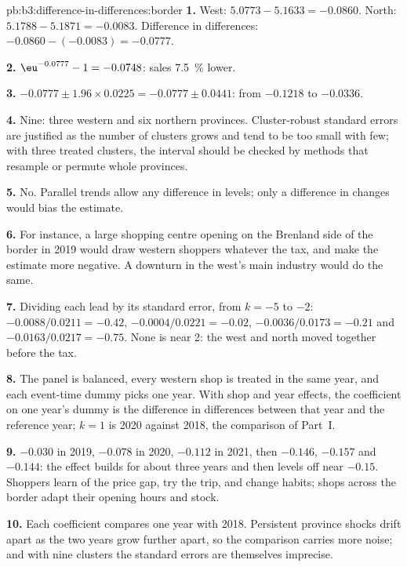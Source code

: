 \begin{solution}{pb:b3:difference-in-differences:border}
\textbf{1.} West: $5.0773 - 5.1633 = -0.0860$. North: $5.1788 - 5.1871 =
-0.0083$. Difference in differences: $-0.0860 - (-0.0083) = -0.0777$.

\textbf{2.} $\eu^{-0.0777} - 1 = -0.0748$: sales 7.5~\% lower.

\textbf{3.} $-0.0777 \pm 1.96 \times 0.0225 = -0.0777 \pm 0.0441$: from $-0.1218$
to $-0.0336$.

\textbf{4.} Nine: three western and six northern provinces. Cluster-robust
standard errors are justified as the number of clusters grows and tend to be too
small with few; with three treated clusters, the interval should be checked by
methods that resample or permute whole provinces.

\textbf{5.} No. Parallel trends allow any difference in levels; only a
difference in changes would bias the estimate.

\textbf{6.} For instance, a large shopping centre opening on the Brenland side
of the border in 2019 would draw western shoppers whatever the tax, and make
the estimate more negative. A downturn in the west's main industry would do the
same.

\textbf{7.} Dividing each lead by its standard error, from $k = -5$ to $-2$:
$-0.0088/0.0211 = -0.42$, $-0.0004/0.0221 = -0.02$, $-0.0036/0.0173 = -0.21$
and $-0.0163/0.0217 = -0.75$. None is near 2: the west
and north moved together before the tax. %

\textbf{8.} The panel is balanced, every western shop is treated in the same
year, and each event-time dummy picks one year. With shop and year effects, the
coefficient on one year's dummy is the difference in differences between that
year and the reference year; $k = 1$ is 2020 against 2018, the comparison of
Part~I.

\textbf{9.} $-0.030$ in 2019, $-0.078$ in 2020, $-0.112$ in 2021, then $-0.146$,
$-0.157$ and $-0.144$: the effect builds for about three years and then levels
off near $-0.15$. Shoppers learn of the price gap, try the trip, and change
habits; shops across the border adapt their opening hours and stock.

\textbf{10.} Each coefficient compares one year with 2018. Persistent province
shocks drift apart as the two years grow further apart, so the comparison
carries more noise; and with nine clusters the standard errors are themselves
imprecise.


\end{solution}
